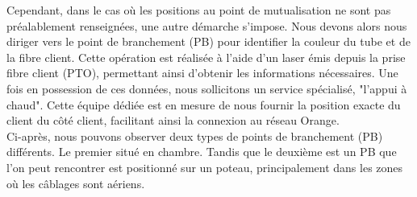 \documentclass[12pt, a4paper]{article}
\begin{document}
Cependant, dans le cas où les positions au point de mutualisation ne
sont pas préalablement renseignées, une autre démarche s'impose.
Nous devons alors nous diriger vers le point de branchement (PB)
pour identifier la couleur du tube et de la fibre client.
Cette opération est réalisée à l'aide d'un laser émis depuis
la prise fibre client (PTO), permettant ainsi d'obtenir les
informations nécessaires. Une fois en possession de ces données,
nous sollicitons un service spécialisé, "l'appui à chaud". Cette
équipe dédiée est en mesure de nous fournir la position exacte du
client du côté client, facilitant ainsi la connexion au réseau Orange.\\

\newpage
Ci-après, nous pouvons observer deux types de points de branchement (PB)
différents. Le premier situé en chambre. Tandis que le deuxième est un PB que l'on peut
rencontrer est positionné sur un poteau, principalement dans les zones où
les câblages sont aériens.
\end{document}
